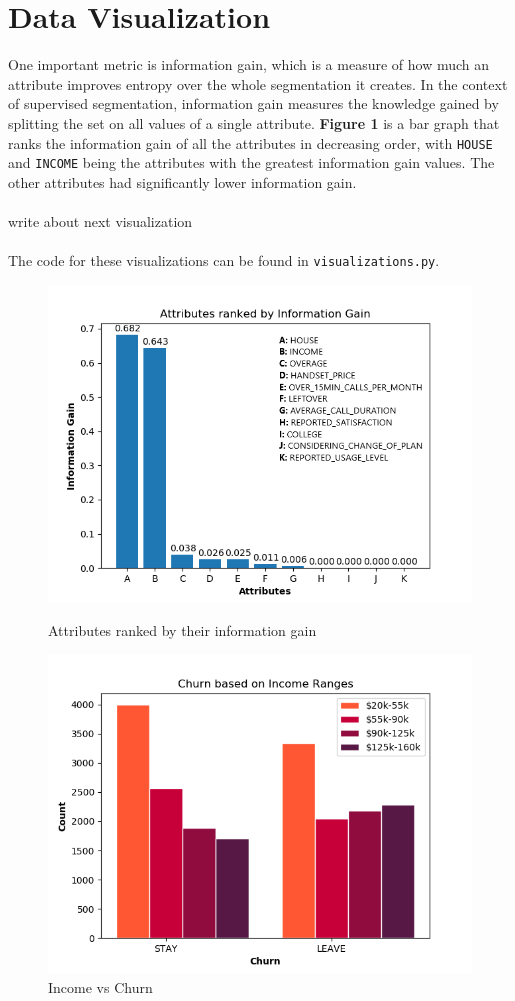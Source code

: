 \documentclass[12pt, notitlepage]{article}
\begin{document}
\section{Data Visualization}
One important metric is information gain, which is a measure of how much an attribute improves entropy over the whole segmentation it creates. In the context of supervised segmentation, information gain measures the knowledge gained by splitting the set on all values of a single attribute. \textbf{Figure 1} is a bar graph that ranks the information gain of all the attributes in decreasing order, with \texttt{HOUSE} and \texttt{INCOME} being the attributes with the greatest information gain values. The other attributes had significantly lower information gain.\\\\
write about next visualization\\\\
The code for these visualizations can be found in \texttt{visualizations.py}. 
\begin{figure}[H]
	\centering
	\includegraphics[scale=0.8]{InformationGain.png}
	\caption{Attributes ranked by their information gain}
	\centering 
	\includegraphics[scale=0.8]{IncomeVsChurn.png}
	\caption{Income vs Churn}
\end{figure}
\end{document}
